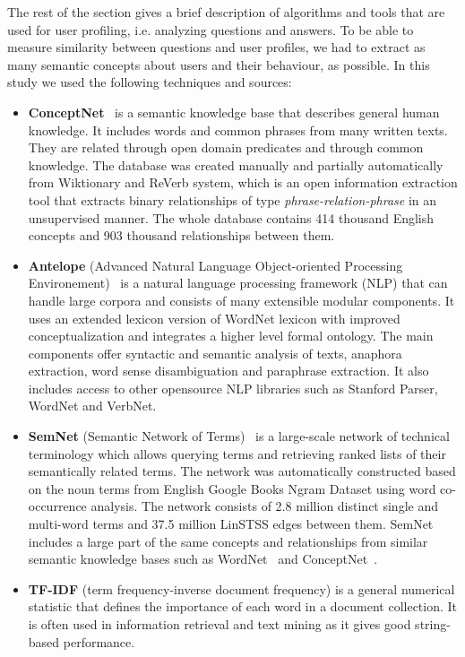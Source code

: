 \documentclass[conference]{IEEEtran}
\begin{document}
The rest of the section gives a brief description of algorithms and tools that are used for user profiling, i.e. analyzing questions and answers. To be able to measure similarity between questions and user profiles, we had to extract as many semantic concepts about users and their behaviour, as possible. In this study we used the following techniques and sources:
\begin{itemize}
	\item {\bf ConceptNet}~\cite{bib:conceptnet} is a semantic knowledge base that describes general human knowledge. It includes words and common phrases from many written texts. They are related through open domain predicates and through common knowledge. The database was created manually and partially automatically from Wiktionary and ReVerb system, which is an open information extraction tool that extracts binary relationships of type {\it phrase-relation-phrase} in an unsupervised manner. The whole database contains 414 thousand English concepts and 903 thousand relationships between them.
	\item {\bf Antelope} (Advanced Natural Language Object-oriented Processing Environement)~\cite{bib:antelope} is a natural language processing framework (NLP) that can handle large corpora and consists of many extensible modular components. It uses an extended lexicon version of WordNet lexicon with improved conceptualization and integrates a higher level formal ontology. The main components offer syntactic and semantic analysis of texts, anaphora extraction, word sense disambiguation and paraphrase extraction. It also includes access to other opensource NLP libraries such as Stanford Parser, WordNet and VerbNet.
	\item {\bf SemNet} (Semantic Network of Terms)~\cite{bib:semnet} is a large-scale network of technical terminology which allows querying terms and retrieving ranked lists of their semantically related terms. The network was automatically constructed based on the noun terms from English Google Books Ngram Dataset using word co-occurrence analysis. The network consists of 2.8 million distinct single and multi-word terms and 37.5 million LinSTSS edges between them. SemNet includes a large part of the same concepts and relationships from similar semantic knowledge bases such as WordNet~\cite{bib:wordnet} and ConceptNet~\cite{bib:conceptnet}. 
	\item {\bf TF-IDF} (term frequency-inverse document frequency) is a general numerical statistic that defines the importance of each word in a document collection. It is often used in information retrieval and text mining as it gives good string-based performance. 
\end{itemize}
	
\end{document}
